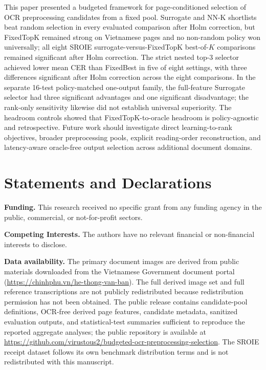 \documentclass[pdflatex,sn-basic,Numbered,iicol]{sn-jnl}
\begin{document}
This paper presented a budgeted framework for page-conditioned selection of OCR preprocessing candidates from a fixed pool. Surrogate and NN-K shortlists beat random selection in every evaluated comparison after Holm correction, but FixedTopK remained strong on Vietnamese pages and no non-random policy won universally; all eight SROIE surrogate-versus-FixedTopK best-of-$K$ comparisons remained significant after Holm correction. The strict nested top-3 selector achieved lower mean CER than FixedBest in five of eight settings, with three differences significant after Holm correction across the eight comparisons. In the separate 16-test policy-matched one-output family, the full-feature Surrogate selector had three significant advantages and one significant disadvantage; the rank-only sensitivity likewise did not establish universal superiority. The headroom controls showed that FixedTopK-to-oracle headroom is policy-agnostic and retrospective. Future work should investigate direct learning-to-rank objectives, broader preprocessing pools, explicit reading-order reconstruction, and latency-aware oracle-free output selection across additional document domains.

\section*{Statements and Declarations}

\textbf{Funding.} This research received no specific grant from any funding agency in the public, commercial, or not-for-profit sectors.

\textbf{Competing Interests.} The authors have no relevant financial or non-financial interests to disclose.

\textbf{Data availability.} The primary document images are derived from public materials downloaded from the Vietnamese Government document portal (\url{https://chinhphu.vn/he-thong-van-ban}). The full derived image set and full reference transcriptions are not publicly redistributed because redistribution permission has not been obtained. The public release contains candidate-pool definitions, OCR-free derived page features, candidate metadata, sanitized evaluation outputs, and statistical-test summaries sufficient to reproduce the reported aggregate analyses; the public repository is available at \url{https://github.com/virustous2/budgeted-ocr-preprocessing-selection}. The SROIE receipt dataset follows its own benchmark distribution terms and is not redistributed with this manuscript.
\end{document}
